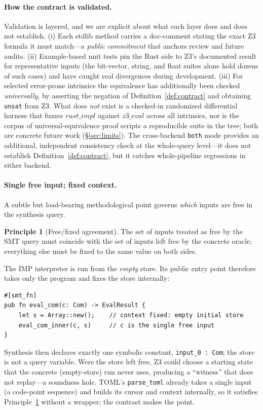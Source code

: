 \documentclass[11pt,a4paper]{article}
\theoremstyle{definition}
\newtheorem{principle}{Principle}
\theoremstyle{remark}
\newcommand{\imp}{IMP}
\newcommand{\toml}{TOML}
\newcommand{\code}[1]{\texttt{#1}}
\begin{document}
\paragraph{How the contract is validated.}
Validation is layered, and we are explicit about what each layer does and does
not establish. (i) Each stdlib method carries a doc-comment stating the exact
Z3 formula it must match---a \emph{public commitment} that anchors review and
future audits. (ii) Example-based unit tests pin the Rust side to Z3's
documented result for representative inputs (the bit-vector, string, and float
suites alone hold dozens of such cases) and have caught real divergences during
development. (iii) For selected error-prone intrinsics the equivalence has
additionally been checked \emph{universally}, by asserting the negation of
Definition~\ref{def:contract} and obtaining \code{unsat} from Z3. What does
\emph{not} exist is a checked-in randomized differential harness that fuzzes
$\mathit{rust\_impl}$ against $\mathit{z3\_eval}$ across all intrinsics, nor is
the corpus of universal-equivalence proof scripts a reproducible suite in the
tree; both are concrete future work (\S\ref{sec:limits}). The cross-backend
\code{both} mode provides an additional, independent consistency check at the
whole-query level---it does not establish Definition~\ref{def:contract}, but it
catches whole-pipeline regressions in either backend.

\paragraph{Single free input; fixed context.}
A subtle but load-bearing methodological point governs \emph{which} inputs are
free in the synthesis query.
\begin{principle}[Free/fixed agreement]\label{prin:free}
The set of inputs treated as free by the SMT query must coincide with the set of
inputs left free by the concrete oracle; everything else must be fixed to the
same value on both sides.
\end{principle}
The \imp{} interpreter is run from the \emph{empty} store. Its public entry point
therefore takes only the program and fixes the store internally:
\begin{lstlisting}[style=rust]
#[smt_fn]
pub fn eval_com(c: Com) -> EvalResult {
    let s = Array::new();    // context fixed: empty initial store
    eval_com_inner(c, s)     // c is the single free input
}
\end{lstlisting}
Synthesis then declares exactly one symbolic constant, \code{input\_0 : Com}; the
store is not a query variable. Were the store left free, Z3 could choose a
starting state that the concrete (empty-store) run never uses, producing a
``witness'' that does not replay---a soundness hole. \toml{}'s \code{parse\_toml}
already takes a single input (a code-point sequence) and builds its cursor and
context internally, so it satisfies Principle~\ref{prin:free} without a wrapper;
the contrast makes the point.
\end{document}
